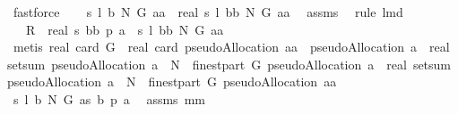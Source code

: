 \begin{isabellebody}
\ fastforce\ \isanewline
{}\isamarkupfalse%
\ \isamarkupfalse%
\ {\isachardoublequoteopen}{\isacharparenleft}{\isacharquery}s\ {\isacharparenleft}{\isacharquery}l\ {\isacharquery}b\ N\ G{\isacharparenright}\ aa{\isacharparenright}\ {\isacharequal}\ real\ {\isacharparenleft}{\isacharquery}s\ {\isacharparenleft}{\isacharquery}l\ {\isacharquery}bb\ N\ G{\isacharparenright}\ aa{\isacharparenright}{\isachardoublequoteclose}\ \isamarkupfalse%
\ assms{\isacharparenleft}{}{\isacharparenright}\ \isamarkupfalse%
\ {\isacharparenleft}rule\ lm{}{}{}d{\isacharparenright}\isanewline
\isanewline
{}\isamarkupfalse%
\ \isamarkupfalse%
\ \isanewline
\ \ {}{\isacharcolon}\ {\isachardoublequoteopen}{\isacharquery}R\ {\isacharequal}\ real\ {\isacharparenleft}{\isacharquery}s\ {\isacharquery}bb\ {\isacharparenleft}{\isacharquery}p\ a{\isacharparenright}{\isacharparenright}\ {\isacharminus}\ {\isacharparenleft}{\isacharquery}s\ {\isacharparenleft}{\isacharquery}l\ {\isacharquery}bb\ N\ G{\isacharparenright}\ aa{\isacharparenright}{\isachardoublequoteclose}\ \isanewline
{}\isamarkupfalse%
\ {\isacharparenleft}metis\ {\isacharbackquoteopen}real\ {\isacharparenleft}card\ G{\isacharparenright}\ {\isacharminus}\ real\ {\isacharparenleft}card\ {\isacharparenleft}pseudoAllocation\ aa\ {\isasyminter}\ pseudoAllocation\ a{\isacharparenright}{\isacharparenright}\ {\isacharequal}\ real\ {\isacharparenleft}setsum\ {\isacharparenleft}pseudoAllocation\ a\ {\isacharless}{\isacharbar}\ {\isacharparenleft}N\ {\isasymtimes}\ finestpart\ G{\isacharparenright}{\isacharparenright}\ {\isacharparenleft}pseudoAllocation\ a{\isacharparenright}{\isacharparenright}\ {\isacharminus}\ real\ {\isacharparenleft}setsum\ {\isacharparenleft}pseudoAllocation\ a\ {\isacharless}{\isacharbar}\ {\isacharparenleft}N\ {\isasymtimes}\ finestpart\ G{\isacharparenright}{\isacharparenright}\ {\isacharparenleft}pseudoAllocation\ aa{\isacharparenright}{\isacharparenright}{\isacharbackquoteclose}{\isacharparenright}\isanewline
\ \ \isamarkupfalse%
\ {\isachardoublequoteopen}{\isacharquery}s\ {\isacharparenleft}{\isacharquery}l\ {\isacharquery}b\ N\ G{\isacharparenright}\ a{\isacharequal}{\isacharparenleft}{\isacharquery}s\ {\isacharquery}b\ {\isacharparenleft}{\isacharquery}p\ a{\isacharparenright}{\isacharparenright}{\isachardoublequoteclose}\ \isamarkupfalse%
\ assms\ mm{}{}\ \isamarkupfalse%

\end{isabellebody}
